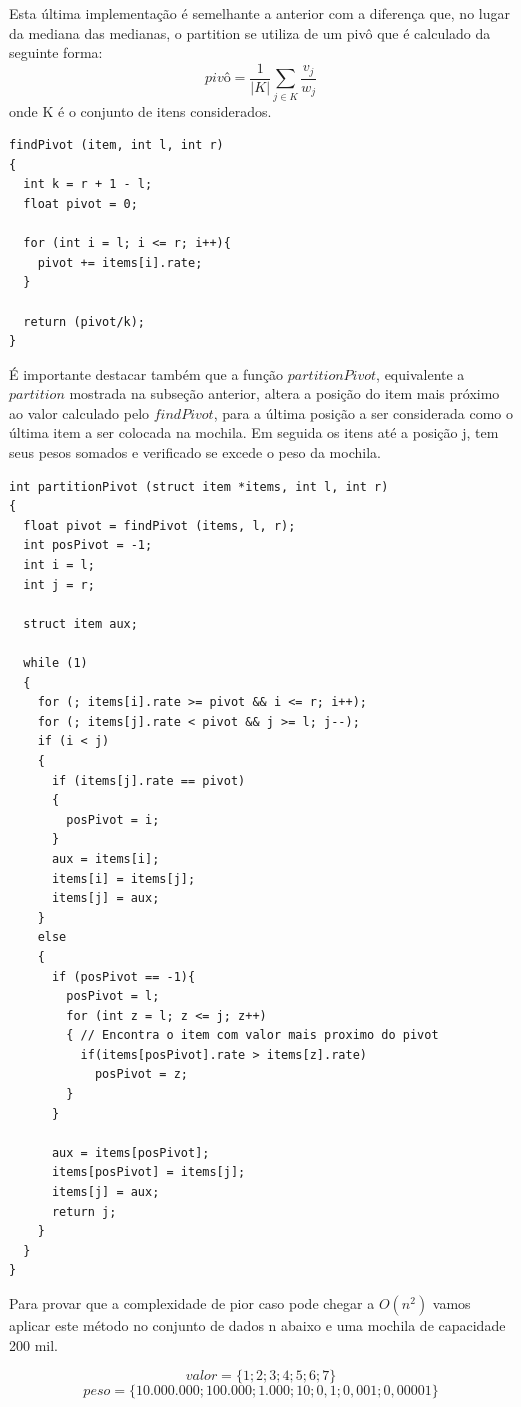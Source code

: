 \documentclass[
	12pt,				%
	oneside,			%
	a4paper,			%
	english,			%
	french,				%
	spanish,			%
	brazil,				%
	]{abntex2}
\begin{document}
Esta última implementação é semelhante a anterior com a diferença que, no lugar da mediana das medianas, o partition se utiliza de um pivô que é calculado da seguinte forma: \[ pivô = \frac{1}{|K|}\sum_{j\in{K}}\frac{v_j}{w_j}\] onde K é o conjunto de itens considerados.

\begin{lstlisting}[mathescape=true, label=pivot]
findPivot (item, int l, int r)
{
  int k = r + 1 - l;
  float pivot = 0;

  for (int i = l; i <= r; i++){
    pivot += items[i].rate;
  }

  return (pivot/k);
}
\end{lstlisting}

É importante destacar também que a função $partitionPivot$, equivalente a $partition$ mostrada na subseção anterior, altera a posição do item mais próximo ao valor calculado pelo $findPivot$, para a última posição a ser considerada como o última item a ser colocada na mochila. Em seguida os itens até a posição j, tem seus pesos somados e verificado se excede o peso da mochila.

\begin{lstlisting}[mathescape=true, label=pivot]
int partitionPivot (struct item *items, int l, int r)
{
  float pivot = findPivot (items, l, r);
  int posPivot = -1;
  int i = l;
  int j = r;
  
  struct item aux;

  while (1)
  {
    for (; items[i].rate >= pivot && i <= r; i++);
    for (; items[j].rate < pivot && j >= l; j--);
    if (i < j)
    {
      if (items[j].rate == pivot)
      {
        posPivot = i;
      }   
      aux = items[i];
      items[i] = items[j];
      items[j] = aux;
    }
    else
    {
      if (posPivot == -1){
        posPivot = l;
        for (int z = l; z <= j; z++)  
        { // Encontra o item com valor mais proximo do pivot
          if(items[posPivot].rate > items[z].rate)
            posPivot = z;
        }
      }
      
      aux = items[posPivot];
      items[posPivot] = items[j];
      items[j] = aux;
      return j;
    }
  }
}
\end{lstlisting}

Para provar que a complexidade de pior caso pode chegar a $O(n^2)$ vamos aplicar este método no conjunto de dados n abaixo e uma mochila de capacidade 200 mil.

\[valor = \{1; 2; 3; 4; 5; 6; 7\}\]
\[peso = \{10.000.000; 100.000; 1.000; 10; 0,1; 0,001; 0,00001\}\]
\end{document}
